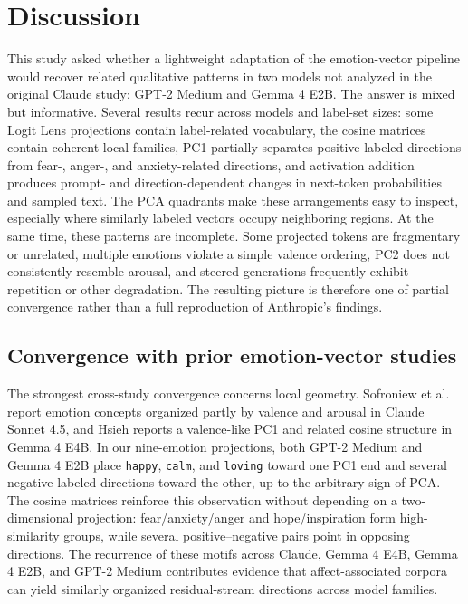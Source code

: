 \section{Discussion}

This study asked whether a lightweight adaptation of the emotion-vector pipeline would recover related qualitative patterns in two 
models not analyzed in the original Claude study: GPT-2 Medium and Gemma 4 E2B. The answer is mixed but informative. Several results 
recur across models and label-set sizes: some Logit Lens projections contain label-related vocabulary, the cosine matrices contain 
coherent local families, PC1 partially separates positive-labeled directions from fear-, anger-, and anxiety-related directions, 
and activation addition produces prompt- and direction-dependent changes in next-token probabilities and sampled text. The PCA 
quadrants make these arrangements easy to inspect, especially where similarly labeled vectors occupy neighboring regions. At the 
same time, these patterns are incomplete. 
Some projected tokens are fragmentary or unrelated, multiple emotions violate a simple valence ordering, PC2 does not consistently 
resemble arousal, and steered generations frequently exhibit repetition or other degradation. The resulting picture is therefore one 
of partial convergence rather than a full reproduction of Anthropic's findings.

\subsection{Convergence with prior emotion-vector studies}

The strongest cross-study convergence concerns local geometry. Sofroniew et al.\ \cite{sofroniew_emotion_2026} report emotion concepts 
organized partly by valence and arousal in Claude Sonnet 4.5, and Hsieh \cite{hsieh_replicating_2026} reports a valence-like PC1 
and related cosine structure in Gemma 4 E4B. In our nine-emotion projections, both GPT-2 Medium and Gemma 4 E2B place 
\texttt{happy}, \texttt{calm}, and \texttt{loving} toward one PC1 end and several negative-labeled directions toward the 
other, up to the arbitrary sign of PCA. The cosine matrices reinforce this observation without depending on a two-dimensional 
projection: fear/anxiety/anger and hope/inspiration form high-similarity groups, while several positive--negative pairs point in 
opposing directions. The recurrence of these motifs across Claude, Gemma 4 E4B, Gemma 4 E2B, and GPT-2 Medium contributes evidence 
that affect-associated corpora can yield similarly organized residual-stream directions across model families.

